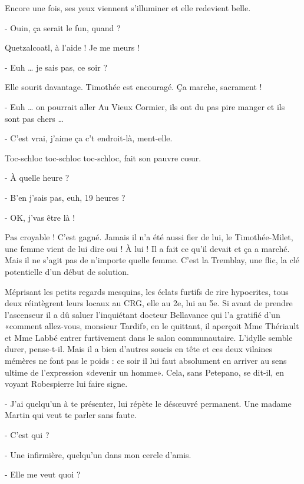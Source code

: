 Encore une fois, ses yeux viennent s’illuminer et elle redevient belle.

- Ouin, ça serait le fun, quand ?

Quetzalcoatl, à l’aide ! Je me meurs !

- Euh … je sais pas, ce soir ?

Elle sourit davantage. Timothée est encouragé. Ça marche, sacrament !

- Euh … on pourrait aller Au Vieux Cormier, ils ont du pas pire manger et ils sont pas chers …

- C’est vrai, j’aime ça c’t endroit-là, ment-elle.

Toc-schloc toc-schloc toc-schloc, fait son pauvre cœur.

- À quelle heure ?

- B’en j’sais pas, euh, 19 heures ?

- OK, j’vas être là !

Pas croyable ! C’est gagné. Jamais il n’a été aussi fier de lui, le Timothée-Milet, une femme vient de lui dire oui ! À lui ! Il a fait ce qu’il devait et ça a marché. Mais il ne s’agit pas de n’importe quelle femme. C’est la Tremblay, une flic, la clé potentielle d’un début de solution.

Méprisant les petits regards mesquins, les éclats furtifs de rire hypocrites, tous deux réintègrent leurs locaux au CRG, elle au 2e, lui au 5e. Si avant de prendre l’ascenseur il a dû saluer l’inquiétant docteur Bellavance qui l’a gratifié d’un «comment allez-vous, monsieur Tardif», en le quittant, il aperçoit Mme Thériault et Mme Labbé entrer furtivement dans le salon communautaire. L’idylle semble durer, pense-t-il. Mais il a bien d’autres soucis en tête et ces deux vilaines mémères ne font pas le poids : ce soir il lui faut absolument en arriver au sens ultime de l’expression «devenir un homme». Cela, sans Petepano, se dit-il, en voyant Robespierre lui faire signe.

- J’ai quelqu’un à te présenter, lui répète le désœuvré permanent. Une madame Martin qui veut te parler sans faute.

- C’est qui ?

- Une infirmière, quelqu’un dans mon cercle d’amis.

- Elle me veut quoi ?

